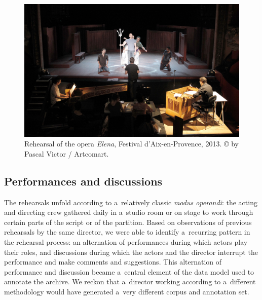 \documentclass[conference]{IEEEtran}
\newcommand{\todo}[1]{\noindent\textcolor{red}{{\bf \{ToDo} #1{\bf \}}}}
\begin{document}
\begin{figure}[htb!]
  \centering
  \includegraphics[width=\columnwidth]{elena}
  \caption{Rehearsal of the opera \emph{Elena}, Festival d’Aix-en-Provence, 2013. © by Pascal Victor / Artcomart.}
  \label{fig:elena}
\end{figure}


\subsection{Performances and discussions}

The rehearsals unfold according to a~relatively classic \emph{modus operandi}: the acting and directing crew gathered daily in a~studio room or on stage to work through certain parts of the script or of the partition. Based on observations of previous rehearsals by the same director, we were able to identify a~recurring pattern in the rehearsal process: an alternation of performances during which actors play their roles, and discussions during which the actors and the director interrupt the performance and make comments and suggestions. This alternation of performance and discussion became a~central element of the data model used to annotate the archive. We reckon that a~director working according to a~different methodology would have generated a~very different corpus and annotation set.

%
%
\end{document}
